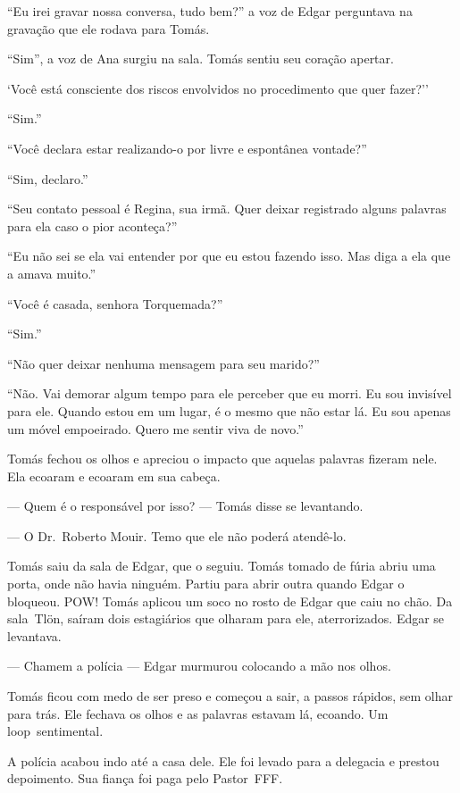 ``Eu irei gravar nossa conversa, tudo bem?''\mudanca{,} a voz de Edgar perguntava na gravação que ele rodava para Tomás.

``Sim'', a voz de Ana surgiu na sala. Tomás sentiu seu coração apertar.

`Você está consciente dos riscos envolvidos no procedimento que quer fazer?''

``Sim.''

``Você declara estar realizando-o por livre e espontânea vontade?''

``Sim, declaro.''

``Seu contato pessoal é Regina, sua irmã. Quer deixar registrado alguns palavras para ela caso o pior aconteça?''

``Eu não sei se ela vai entender por que eu estou fazendo isso. Mas diga a ela que a amava muito.''

``Você é casada, senhora Torquemada?''

``Sim.''

``Não quer deixar nenhuma mensagem para seu marido?''

``Não. Vai demorar algum tempo para ele perceber que eu morri. Eu sou invisível para ele. Quando estou em um lugar, é o mesmo que não estar lá. Eu sou apenas um móvel empoeirado. Quero me sentir viva de novo.''

Tomás fechou os olhos e apreciou o impacto que aquelas palavras fizeram nele. Ela ecoaram e ecoaram em sua cabeça.

--- Quem é o responsável por isso? --- Tomás disse se levantando.

--- O Dr.~Roberto Mouir. Temo que ele não poderá atendê-lo.

Tomás saiu da sala de Edgar, que o seguiu. Tomás tomado de fúria abriu uma porta, onde não havia ninguém. Partiu para abrir outra quando Edgar o bloqueou. POW! Tomás aplicou um soco no rosto de Edgar que caiu no chão. Da sala~Tlön, saíram dois estagiários que olharam para ele, aterrorizados. Edgar se levantava.

--- Chamem a polícia --- Edgar murmurou\mudanca{,} colocando a mão nos olhos.

Tomás ficou com medo de ser preso e começou a sair, a passos rápidos, sem olhar para trás. Ele fechava os olhos e as palavras estavam lá, ecoando. Um loop~sentimental.

A polícia acabou indo até a casa dele. Ele foi levado para a delegacia e prestou depoimento. Sua fiança foi paga pelo Pastor~FFF.

